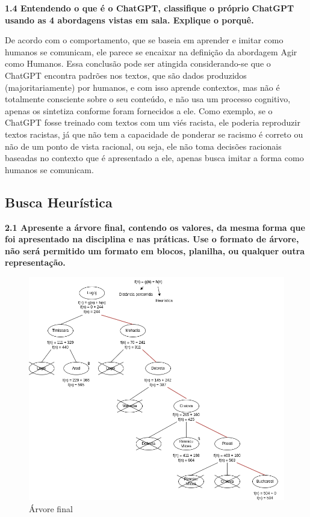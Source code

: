 \begin{adjustwidth}{1em}{}
\textbf{1.4 Entendendo o que é o ChatGPT, classifique o próprio ChatGPT usando as 4
abordagens vistas em sala. Explique o porquê.}
\end{adjustwidth}

De acordo com o comportamento, que se baseia em aprender e imitar como humanos se comunicam, ele parece se encaixar na definição da abordagem Agir como Humanos. Essa conclusão pode ser atingida considerando-se que o ChatGPT encontra padrões nos textos, que são dados produzidos (majoritariamente) por humanos, e com isso aprende contextos, mas não é totalmente consciente sobre o seu conteúdo, e não usa um processo cognitivo, apenas os sintetiza conforme foram fornecidos a ele. Como exemplo, se o ChatGPT fosse treinado com textos com um viés racista, ele poderia reproduzir textos racistas, já que não tem a capacidade de ponderar se racismo é correto ou não de um ponto de vista racional, ou seja, ele não toma decisões racionais baseadas no contexto que é apresentado a ele, apenas busca imitar a forma como humanos se comunicam.

\subsection{Busca Heurística}

\begin{adjustwidth}{1em}{}
\textbf{2.1 Apresente a árvore final, contendo os valores, da mesma forma que foi apresentado
na disciplina e nas práticas. Use o formato de árvore, não será permitido um formato em blocos,
planilha, ou qualquer outra representação.}
\end{adjustwidth}

\begin{figure}[H]
\centering
\includegraphics[width=0.8\linewidth]{apendices/fig/1_IAA001_4.png}
\caption{Árvore final}
\label{arvoreF}
\end{figure}

